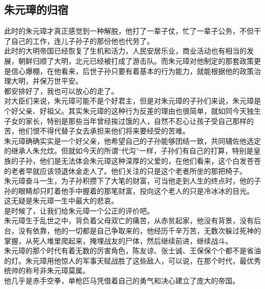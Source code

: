 \begin{multicols}{\theparacolNo}
\subsection{朱元璋的归宿}
此时的朱元璋才真正感觉到一种解脱，他打了一辈子仗，忙了一辈子公务，不但干了自己的工作，连儿子孙子的那份他也代劳了。\\

此时的大明帝国已经恢复了生机和活力，人民安居乐业，商业活动也有相当的发展，朝鲜归顺了大明，北元已经被打成了游击队。而朱元璋对他制定的那套政策更是信心爆棚，在他看来，后世子孙只要有着基本的行为能力，就能根据他的政策治理大明，并保万世平安。\\

都安排好了，我也可以放心的走了。\\

对大臣们来说，朱元璋可能不是个好君主，但是对朱元璋的子孙们来说，朱元璋是个好父亲、好祖父。其实朱元璋的这种行为反差的理由也很简单，就如同今天独生子女的家长，特别是那些当年曾经挨过饿的人，自然不忍心让孩子受自己那样的苦，他们恨不得代替子女去承担来他们将来要经受的苦难。\\

朱元璋确确实实是一个好父亲，他希望自己的子孙能够团结一致，共同辅佐他选定的继承人朱允炆。但就如今天的所谓“代沟”一样，子孙们有自己的打算，特别是皇族的子孙，他们是无法体会朱元璋这种深厚的父爱的，在他们看来，这个白发苍苍的老者早就应该领退休金走人了。他们关注的只是这个老者所坐的那把椅子。\\

朱元璋奋斗一生，为子孙积攒下了大笔的财富，可当他走到人生的终点时，他的子孙的眼睛却只盯着他手中握着的那笔财富，投向这个老人的只是冷冰冰的目光。\\

这无疑是朱元璋一生中最大的悲哀。\\

是时候了，让我们给朱元璋一个公正的评价吧。\\

朱元璋生于乱世之中，背负着父母双亡的痛苦，从赤贫起家，他没有背景，没有后台，没有依靠，他的一切都是自己争取来的，他经历千辛万苦，无数次躲过死神的掌握，从死人堆里爬起来，掩埋战友的尸体，然后继续前进，继续战斗。\\

朱元璋的那个时代有着无数的厉害角色，陈友谅、张士诚、王保保个个都不是省油的灯。朱元璋用他惊人的军事天赋战胜了这些敌人，可以说，在那个时代，最优秀统帅的称号非朱元璋莫属。\\

他几乎是赤手空拳，单枪匹马凭借着自己的勇气和决心建立了庞大的帝国。\\


\end{multicols}
